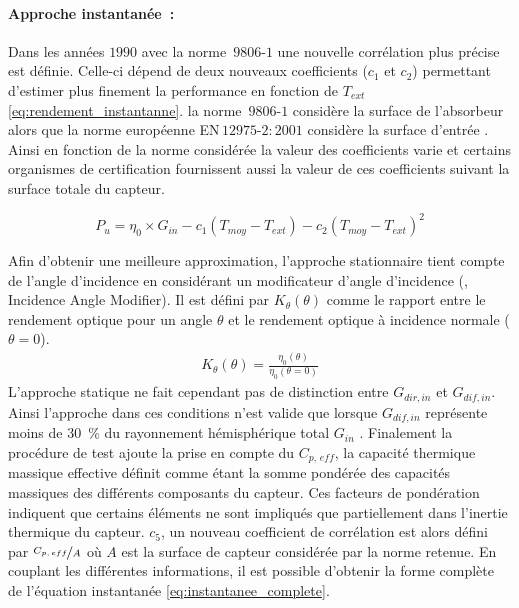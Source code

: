 \paragraph{Approche instantanée~:} %
\label{par:approche_instantanée}
Dans les années $1990$ avec la norme \,$9806$-$1$ une nouvelle corrélation plus
précise est définie. Celle-ci dépend de deux nouveaux coefficients ($c_{1}$ et $c_{2}$)
permettant d’estimer plus finement la performance en fonction de $T_{ext}$
\eqref{eq:rendement_instantanne}. la norme \,$9806$-$1$ considère la surface de
l’absorbeur alors que la norme européenne EN\,$12975$-$2:2001$ considère la surface
d’entrée \parencite{EN1297522001}. Ainsi en fonction de la norme considérée la valeur des
coefficients varie et certains organismes de certification fournissent aussi la
valeur de ces coefficients suivant la surface totale du capteur.

\begin{equation}\label{eq:rendement_instantanne}
    P_{u} = \eta_{0} \times G_{in}- c_{1} (T_{moy} - T_{ext}) - c_{2} (T_{moy} - T_{ext})^{2}
\end{equation}

Afin d’obtenir une meilleure approximation, l’approche stationnaire tient compte
de l’angle d’incidence en considérant un modificateur d’angle d’incidence (, Incidence Angle Modifier).
Il est défini par $K_{\theta}(\theta)$ comme le rapport entre le rendement optique pour un angle $\theta$
et le rendement optique à incidence normale ($\theta = 0$).
\begin{equation}\label{eq:IAM}
    \begin{aligned}
    K_{\theta}(\theta) = \frac{\eta_{0}(\theta)}{\eta_{0}(\theta = 0)}
    \end{aligned}
\end{equation}
L’approche statique ne fait cependant pas de distinction entre $G_{dir, in}$ et $G_{dif,
in}$. Ainsi l’approche dans ces conditions n’est valide que lorsque $G_{dif, in}$
représente moins de \SI{30}{\percent} du rayonnement hémisphérique total $G_{in}$ \parencite{Osorio2014}.
Finalement la procédure de test ajoute la prise en compte du $C_{p,\,eff}$, la capacité
thermique massique effective définit comme étant la somme pondérée des capacités
massiques des différents composants du capteur. Ces facteurs de pondération indiquent que certains éléments
ne sont impliqués que partiellement dans l'inertie thermique du capteur. $c_{5}$, un nouveau coefficient de
corrélation est alors défini par $\nicefrac{C_{p,\,eff}}{A}$ où $A$ est la surface de
capteur considérée par la norme retenue. En couplant les différentes informations, il est
possible d’obtenir la forme complète de l’équation instantanée
\eqref{eq:instantanee_complete}.

